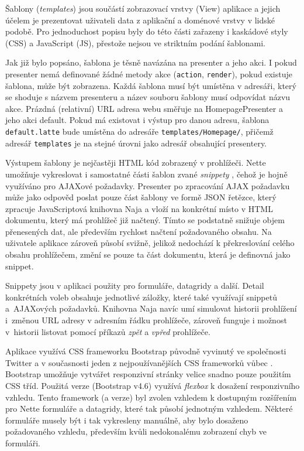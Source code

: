 Šablony (\textit{templates}) jsou součástí zobrazovací vrstvy (View) aplikace a jejich účelem je prezentovat uživateli data z aplikační a doménové vrstvy v lidské podobě. Pro jednoduchost popisu byly do této části zařazeny i kaskádové styly (CSS) a JavaScript (JS), přestože nejsou ve striktním podání šablonami.

Jak již bylo popsáno, šablona je těsně navázána na presenter a jeho akci. I pokud presenter nemá definované žádné metody akce (\texttt{action}, \texttt{render}), pokud existuje šablona, může být zobrazena. Každá šablona musí být umístěna v adresáři, který se shoduje s názvem presenteru a název souboru šablony musí odpovídat názvu akce. Prázdná (relativní) URL adresa webu směřuje na HomepagePresenter a jeho akci default. Pokud má existovat i výstup pro danou adresu, šablona \texttt{default.latte} bude umístěna do adresáře \texttt{templates/Homepage/}, přičemž adresář \texttt{templates} je na stejné úrovni jako adresář obsahující presentery.

Výstupem šablony je nejčastěji HTML kód zobrazený v prohlížeči. Nette umožňuje vykreslovat i samostatné části šablon zvané \textit{snippety} \cite{NetteDocs}, čehož je hojně využíváno pro AJAXové požadavky. Presenter po zpracování AJAX požadavku může jako odpověd poslat pouze část šablony ve formě JSON řetězce, který zpracuje JavaScriptová knihovna Naja a vloží na konkrétní místo v HTML dokumentu, který má prohlížeč již načtený. Tímto se podstatně snižuje objem přenesených dat, ale především rychlost načtení požadovaného obsahu. Na uživatele aplikace zároveň působí svižně, jelikož nedochází k překreslování celého obsahu prohlížečem, změní se pouze ta část dokumentu, která je definovná jako snippet.

Snippety jsou v aplikaci použity pro formuláře, datagridy a další. Detail konkrétních voleb obsahuje jednotlivé záložky, které také využívají snippetů a~AJAXových požadavků. Knihovna Naja navíc umí simulovat historii prohlížení i~změnou URL adresy v adresním řádku prohlížeče, zároveň funguje i možnost v~historii listovat pomocí příkazů \textit{zpět} a \textit{vpřed} prohlížeče.

Aplikace využívá CSS frameworku Bootstrap původně vyvinutý ve společnosti Twitter a v současnosti jeden z nejpoužívanějších CSS frameworků vůbec \cite{Bootstrap}. Bootstrap umožňuje vytvářet responzivní stránky velice snadno pouze použitím CSS tříd. Použitá verze (Bootstrap v4.6) využívá \textit{flexbox} k dosažení responzivního vzhledu. Tento framework (a verze) byl zvolen vzhledem k dostupným rozšířením pro Nette formuláře a datagridy, které tak působí jednotným vzhledem. Některé formuláře musely být i tak vykresleny manuálně, aby bylo dosaženo požadovaného vzhledu, především kvůli nedokonalému zobrazení chyb ve formuláři.

